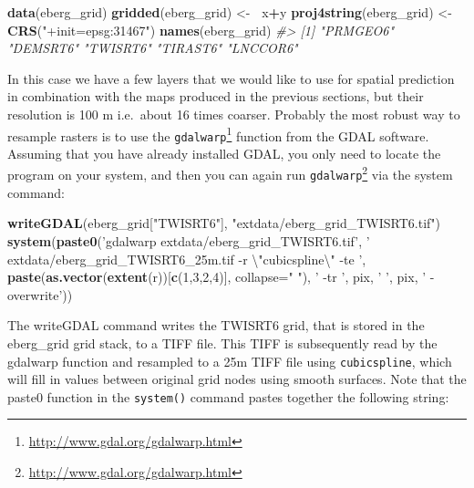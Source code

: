 \documentclass[11pt]{krantz}
\newenvironment{Shaded}{\begin{snugshade}}{\end{snugshade}}
\newcommand{\CharTok}[1]{\textcolor[rgb]{0.5,0.5,0.5}{#1}}
\newcommand{\CommentTok}[1]{\textcolor[rgb]{0.37,0.37,0.37}{\textit{#1}}}
\newcommand{\DataTypeTok}[1]{\textcolor[rgb]{0.27,0.27,0.27}{#1}}
\newcommand{\DecValTok}[1]{\textcolor[rgb]{0.06,0.06,0.06}{#1}}
\newcommand{\ErrorTok}[1]{\textcolor[rgb]{0.14,0.14,0.14}{\textbf{#1}}}
\newcommand{\KeywordTok}[1]{\textcolor[rgb]{0.27,0.27,0.27}{\textbf{#1}}}
\newcommand{\NormalTok}[1]{#1}
\newcommand{\OperatorTok}[1]{\textcolor[rgb]{0.43,0.43,0.43}{\textbf{#1}}}
\newcommand{\StringTok}[1]{\textcolor[rgb]{0.5,0.5,0.5}{#1}}
\renewcommand{\href}[2]{#2\footnote{\url{#1}}}
\theoremstyle{definition}
\theoremstyle{definition}
\theoremstyle{definition}
\theoremstyle{remark}
\begin{document}
\begin{Shaded}
\begin{Highlighting}[]
\KeywordTok{data}\NormalTok{(eberg_grid)}
\KeywordTok{gridded}\NormalTok{(eberg_grid) <-}\StringTok{ }\ErrorTok{~}\NormalTok{x}\OperatorTok{+}\NormalTok{y}
\KeywordTok{proj4string}\NormalTok{(eberg_grid) <-}\StringTok{ }\KeywordTok{CRS}\NormalTok{(}\StringTok{"+init=epsg:31467"}\NormalTok{)}
\KeywordTok{names}\NormalTok{(eberg_grid)}
\CommentTok{#> [1] "PRMGEO6" "DEMSRT6" "TWISRT6" "TIRAST6" "LNCCOR6"}
\end{Highlighting}
\end{Shaded}

In this case we have a few layers that we would like to use for spatial
prediction in combination with the maps produced in the previous
sections, but their resolution is 100 m i.e.~about 16 times coarser.
Probably the most robust way to resample rasters is to use the
\href{http://www.gdal.org/gdalwarp.html}{\texttt{gdalwarp}} function
from the GDAL software. Assuming that you have already installed GDAL,
you only need to locate the program on your system, and then you can
again run \href{http://www.gdal.org/gdalwarp.html}{\texttt{gdalwarp}}
via the system command:

\begin{Shaded}
\begin{Highlighting}[]
\KeywordTok{writeGDAL}\NormalTok{(eberg_grid[}\StringTok{"TWISRT6"}\NormalTok{], }\StringTok{"extdata/eberg_grid_TWISRT6.tif"}\NormalTok{)}
\KeywordTok{system}\NormalTok{(}\KeywordTok{paste0}\NormalTok{(}\StringTok{'gdalwarp extdata/eberg_grid_TWISRT6.tif'}\NormalTok{,}
              \StringTok{' extdata/eberg_grid_TWISRT6_25m.tif -r }\CharTok{\textbackslash{}"}\StringTok{cubicspline}\CharTok{\textbackslash{}"}\StringTok{ -te '}\NormalTok{, }
              \KeywordTok{paste}\NormalTok{(}\KeywordTok{as.vector}\NormalTok{(}\KeywordTok{extent}\NormalTok{(r))[}\KeywordTok{c}\NormalTok{(}\DecValTok{1}\NormalTok{,}\DecValTok{3}\NormalTok{,}\DecValTok{2}\NormalTok{,}\DecValTok{4}\NormalTok{)], }\DataTypeTok{collapse=}\StringTok{" "}\NormalTok{),}
              \StringTok{' -tr '}\NormalTok{, pix, }\StringTok{' '}\NormalTok{, pix, }\StringTok{' -overwrite'}\NormalTok{))}
\end{Highlighting}
\end{Shaded}

The writeGDAL command writes the TWISRT6 grid, that is stored in the
eberg\_grid grid stack, to a TIFF file. This TIFF is subsequently read
by the gdalwarp function and resampled to a 25m TIFF file using
\texttt{cubicspline}, which will fill in values between original grid
nodes using smooth surfaces. Note that the paste0 function in the
\texttt{system()} command pastes together the following string:
\end{document}
